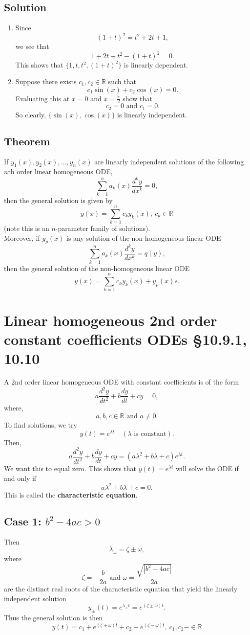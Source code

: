 \documentclass[11pt]{article}
\newcommand{\reals}{\mathbb{R}}
\begin{document}
\subsection*{Solution}
\begin{enumerate}[ (i) ]
\item Since
\[ (1 + t)^2 = t^2 + 2t + 1, \]
we see that
\[ 1 + 2t + t^2 - (1 + t)^2 = 0. \]
This shows that $\{ 1, t, t^2, (1+t)^2 \}$ is linearly dependent.

\item Suppose there exists $c_1, c_2 \in \reals$ such that
\[ c_1 \sin(x) + c_2 \cos(x) = 0. \]
Evaluating this at $x=0$ and $x = \frac{\pi}{2}$ show that
\[ c_2 = 0 \text{ and } c_1 = 0. \]
So clearly, $\{ \sin(x), \cos(x) \}$ is linearly independent.
\end{enumerate}

\subsection{Theorem}
If $y_1(x), y_2(x), ..., y_n(x)$ are linearly independent solutions of the following $n$th order linear homogeneous ODE,
\[ \sum_{k=1}^n a_k(x) \frac{d^k y}{dx^k} = 0, \]
then the general solution is given by
\[ y(x) = \sum_{k=1}^n c_k y_k(x),\ c_k \in \reals \]
(note this is an $n$-parameter family of solutions).\\
Moreover, if $y_p(x)$ is any solution of the non-homogeneous linear ODE
\[ \sum_{k=1}^n a_k(x) \frac{d^k y}{dx^k} = q(y), \]
then the general solution of the non-homogeneous linear ODE
\[ y(x) = \sum_{k=1}^n c_k y_k(x) + y_p(x)s. \]

\section{Linear homogeneous 2nd order constant coefficients ODEs §10.9.1, 10.10}
A 2nd order linear homogeneous ODE with constant coefficients is of the form
\[ a \frac{d^2 y}{dt^2} + b \frac{dy}{dt} + cy = 0, \]
where,
\[ a, b, c \in \reals \text{ and } a \not= 0. \]
To find solutions, we try
\[ y(t) = e^{\lambda t} \quad (\lambda \text{ is constant}). \]
Then,
\[ a \frac{d^2 y}{dt^2} + b \frac{dy}{dt} + cy = \left( a \lambda^2 + b \lambda + c \right) e^{\lambda t}. \]
We want this to equal zero. This shows that $y(t) = e^{\lambda t}$ will solve the ODE if and only if
\[ a \lambda^2 + b \lambda + c = 0. \]
This is called the \textbf{characteristic equation}.

\subsection*{Case 1: $b^2 - 4ac > 0$}
Then
\[ \lambda_\pm = \zeta \pm \omega, \]
where
\[ \zeta = -\frac{b}{2a} \text{ and } \omega = \frac{\sqrt{|b^2 - 4ac|}}{2a} \]
are the distinct real roots of the characteristic equation that yield the linearly independent solution
\[ y_\pm(t) = e^{\lambda_\pm t} = e^{(\zeta \pm \omega)t}. \]
Thus the general solution is then
\[ y(t) = c_1+ e^{(\zeta + \omega)t} + c_2- e^{(\zeta - \omega)t},\ c_1, c_2- \in \reals \]
\end{document}
